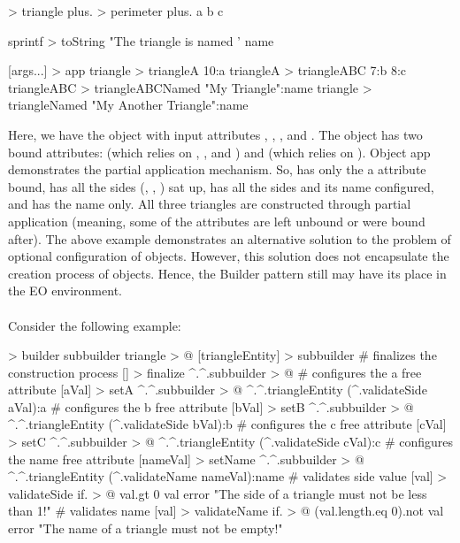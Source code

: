 \documentclass[12pt]{book}
\begin{document}
{{\begin{ffcode}
[a b c name] > triangle
  plus. > perimeter
    plus.
      a
      b
    c

  sprintf > toString
    "The triangle is named '%
    name


[args...] > app
  triangle > triangleA
    10:a
  triangleA > triangleABC
    7:b
    8:c
  triangleABC > triangleABCNamed
    "My Triangle":name
  triangle > triangleNamed
    "My Another Triangle":name
    
\end{ffcode}

Here, we have the  object with input attributes , , , and . The  object has two bound attributes:  (which relies on , , and ) and  (which relies on ). Object app demonstrates the partial application mechanism. So,  has only the a attribute bound,  has all the sides (, , ) sat up,  has all the sides and its name configured, and  has the name only. All three triangles are constructed through partial application (meaning, some of the attributes are left unbound or were bound after). The above example demonstrates an alternative solution to the problem of optional configuration of objects. However, this solution does not encapsulate the creation process of objects. Hence, the Builder pattern still may have its place in the EO environment.
\\
\\
Consider the following example:

\begin{ffcode}
[] > builder
  subbuilder triangle > @
  [triangleEntity] > subbuilder
    # finalizes the construction process
    [] > finalize
      ^.^.subbuilder > @
    # configures the a free attribute
    [aVal] > setA
      ^.^.subbuilder > @
        ^.^.triangleEntity
          (^.validateSide aVal):a
    # configures the b free attribute
    [bVal] > setB
      ^.^.subbuilder > @
        ^.^.triangleEntity
          (^.validateSide bVal):b
    # configures the c free attribute
    [cVal] > setC
      ^.^.subbuilder > @
        ^.^.triangleEntity
          (^.validateSide cVal):c
    # configures the name free attribute
    [nameVal] > setName
      ^.^.subbuilder > @
        ^.^.triangleEntity
          (^.validateName nameVal):name
    # validates side value
    [val] > validateSide
      if. > @
        val.gt 0
        val
        error
          "The side of a triangle must not be less than 1!"
    # validates name
    [val] > validateName
      if. > @
        (val.length.eq 0).not
        val
        error
          "The name of a triangle must not be empty!"


\end{ffcode}}}
\end{document}
